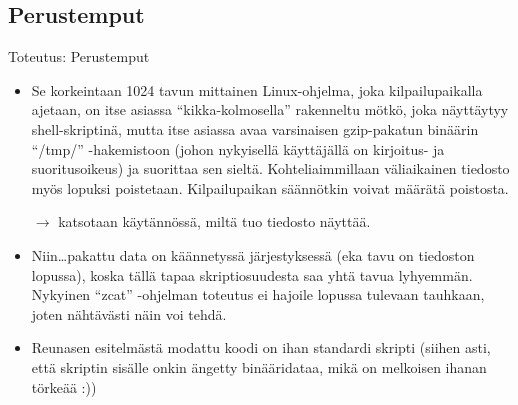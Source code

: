 \documentclass[pdf,10pt]{beamer}
\begin{document}
\subsection{Perustemput}
\begin{frame}{Toteutus: Perustemput}
  \begin{itemize}
    \item Se korkeintaan 1024 tavun mittainen Linux-ohjelma, joka
      kilpailupaikalla ajetaan, on itse asiassa ``kikka-kolmosella''
      rakenneltu mötkö, joka näyttäytyy shell-skriptinä, mutta itse
      asiassa avaa varsinaisen gzip-pakatun binäärin ``/tmp/''
      -hakemistoon (johon nykyisellä käyttäjällä on kirjoitus- ja
      suoritusoikeus) ja suorittaa sen sieltä. Kohteliaimmillaan
      väliaikainen tiedosto myös lopuksi poistetaan. Kilpailupaikan
      säännötkin voivat määrätä poistosta.
    \item[$\rightarrow$] katsotaan käytännössä, miltä tuo tiedosto
      näyttää.
    \item Niin\ldots pakattu data on käännetyssä järjestyksessä (eka
      tavu on tiedoston lopussa), koska tällä tapaa skriptiosuudesta
      saa yhtä tavua lyhyemmän. Nykyinen ``zcat'' -ohjelman toteutus
      ei hajoile lopussa tulevaan tauhkaan, joten nähtävästi näin voi
      tehdä.
    \item Reunasen esitelmästä modattu koodi on ihan standardi skripti
      (siihen asti, että skriptin sisälle onkin ängetty binääridataa,
      mikä on melkoisen ihanan törkeää :))
  \end{itemize}
\end{frame}
\end{document}
